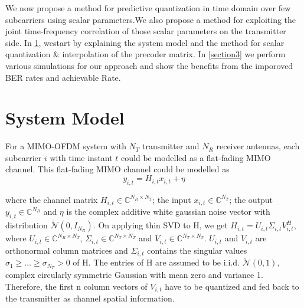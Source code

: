 \documentclass[conference]{IEEEtran}
\begin{document}
We now propose a method for predictive quantization in time domain over few subcarriers using scalar parameters.We also propose a method for exploiting the joint time-frequency correlation of those scalar parameters on the transmitter side. In \ref{section2}, westart by explaining the system model and the method for scalar quantization \& interpolation of the precoder matrix. In \ref{section3} we perform various simulations for our approach and show the benefits from the imporoved BER rates and achievable Rate. 

\section{System Model}
\label{section2}
For a MIMO-OFDM system with $N_T$ transmitter and $N_R$ receiver antennas, each subcarrier $i$ with time instant $t$ could be modelled as a flat-fading MIMO channel. This flat-fading MIMO channel could be modelled as 
\vspace{-1pt}
\begin{equation}
y_{i,t} = H_{i,t} x_{i,t}+ \eta
\end{equation}

\vspace{-1pt}
where the channel matrix $H_{i,t} \in \mathbb{C}^{N_R \times N_T}$; the input $x_{i,t} \in \mathbb{C}^{N_T}$; the output $y_{i,t} \in \mathbb{C}^{N_R}$ and $\eta$ is the complex additive white gaussian noise vector with distribution $\tilde{\mathcal{N}}(0,I_{N_R})$. On applying thin SVD to H, we get $H_{i,t} = U_{i,t} \Sigma_{i,t} V_{i,t}^{H}$, where $U_{i,t} \in \mathbb{C}^{N_R \times N_T}$, $\Sigma_{i,t} \in \mathbb{C}^{N_T \times N_T}$  and $V_{i,t} \in \mathbb{C}^{N_T \times N_T}$. $U_{i,t}$ and $V_{i,t}$ are orthonormal column matrices and $\Sigma_{i,t}$ contains the singular values $\sigma_1 \geq \ldots \geq \sigma_{N_T} > 0$ of H. The entries of H are assumed to be i.i.d. $\tilde{\mathcal{N}}(0,1)$, complex circularly symmetric Gaussian with mean zero and variance 1. Therefore, the first n column vectors of $V_{i,t}$ have to be quantized and fed back to the transmitter as channel spatial information.
\end{document}
